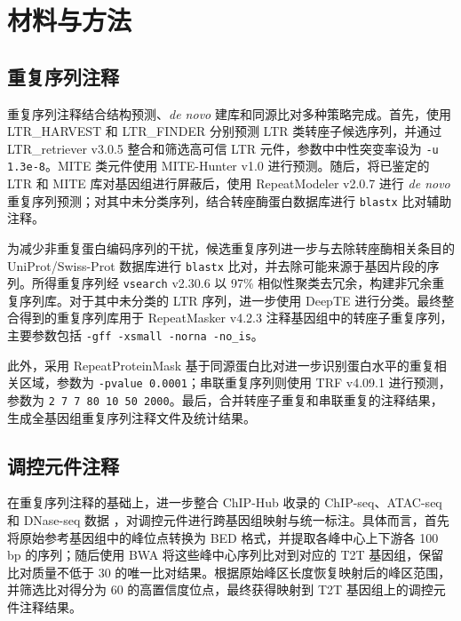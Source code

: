 \section{材料与方法}

\subsection{重复序列注释}

重复序列注释结合结构预测、\textit{de novo} 建库和同源比对多种策略完成。首先，使用 LTR\_HARVEST 和 LTR\_FINDER 分别预测 LTR 类转座子候选序列，并通过 LTR\_retriever v3.0.5 整合和筛选高可信 LTR 元件\cite{ou2018ltr_retriever}，参数中中性突变率设为 \texttt{-u 1.3e-8}。MITE 类元件使用 MITE-Hunter v1.0 进行预测\cite{han2010mite}。随后，将已鉴定的 LTR 和 MITE 库对基因组进行屏蔽后，使用 RepeatModeler v2.0.7 进行 \textit{de novo} 重复序列预测\cite{flynn2020repeatmodeler2}；对其中未分类序列，结合转座酶蛋白数据库进行 \texttt{blastx} 比对辅助注释\cite{ye2006blast}。

为减少非重复蛋白编码序列的干扰，候选重复序列进一步与去除转座酶相关条目的 UniProt/Swiss-Prot 数据库进行 \texttt{blastx} 比对，并去除可能来源于基因片段的序列。所得重复序列经 \texttt{vsearch} v2.30.6 以 97\% 相似性聚类去冗余，构建非冗余重复序列库\cite{edgar2010search}。对于其中未分类的 LTR 序列，进一步使用 DeepTE 进行分类\cite{yan2020deepte}。最终整合得到的重复序列库用于 RepeatMasker v4.2.3 注释基因组中的转座子重复序列\cite{chen2004using}，主要参数包括 \texttt{-gff -xsmall -norna -no\_is}。

此外，采用 RepeatProteinMask 基于同源蛋白比对进一步识别蛋白水平的重复相关区域\cite{chen2004using}，参数为 \texttt{-pvalue 0.0001}；串联重复序列则使用 TRF v4.09.1 进行预测\cite{benson1999tandem}，参数为 \texttt{2 7 7 80 10 50 2000}。最后，合并转座子重复和串联重复的注释结果，生成全基因组重复序列注释文件及统计结果。

\subsection{调控元件注释}

在重复序列注释的基础上，进一步整合 ChIP-Hub 收录的 ChIP-seq、ATAC-seq 和 DNase-seq 数据 \cite{fu2022chip}，对调控元件进行跨基因组映射与统一标注。具体而言，首先将原始参考基因组中的峰位点转换为 BED 格式，并提取各峰中心上下游各 100 bp 的序列；随后使用 BWA 将这些峰中心序列比对到对应的 T2T 基因组\cite{jung2022bwa}，保留比对质量不低于 30 的唯一比对结果。根据原始峰区长度恢复映射后的峰区范围，并筛选比对得分为 60 的高置信度位点，最终获得映射到 T2T 基因组上的调控元件注释结果。

